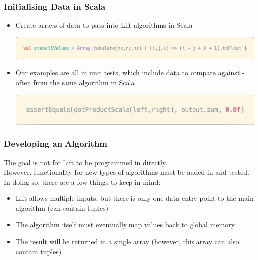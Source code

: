 \documentclass[10pt]{beamer}
\begin{document}
\begin{frame}
\frametitle{Initialising Data in Scala}
\begin{itemize}
    \item Create arrays of data to pass into Lift algorithms in Scala 
        \vspace{-.5cm}
\begin{block}{}
    \begin{center}
         \includegraphics[width=.85\textwidth]{../images/scalaArrays.png}
    \end{center}
\end{block}
    \item Our examples are all in unit tests, which include data to compare against - often from the same algorithm in Scala 
        \vspace{-.5cm}
    \begin{block}{}
        \begin{center}
            \includegraphics[width=.8\textwidth]{../images/unitTestData.png}
        \end{center}
    \end{block}
\end{itemize}
\end{frame}

\begin{frame}
\frametitle{Developing an Algorithm}
The goal is not for Lift to be programmed in directly.\\
\vspace{.1cm}
However, functionality for new types of algorithms must be added in and tested. In doing so, there are a few things to keep in mind: 
\begin{itemize}
    \item Lift allows multiple inputs, but there is only one data entry point to the main algorithm (can contain tuples)
    \item The algorithm itself must eventually map values back to global memory
    \item The result will be returned in a single array (however, this array can also contain tuples)
\end{itemize}
\end{frame}
\end{document}
